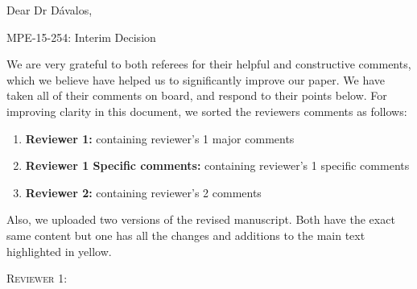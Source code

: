 \documentclass[12pt,letterpaper]{article}
\renewcommand{\section}[1]{%
\bigskip
\begin{center}
\begin{Large}
\normalfont\scshape #1
\medskip
\end{Large}
\end{center}}
\begin{document}
Dear Dr D\'{a}valos,

MPE-15-254: Interim Decision

We are very grateful to both referees for their helpful and constructive comments, which we believe have helped us to significantly improve our paper. We have taken all of their comments on board, and respond to their points below. For improving clarity in this document, we sorted the reviewers comments as follows:
\begin{enumerate}
\item \textbf{Reviewer 1:} containing reviewer's 1 major comments
\item \textbf{Reviewer 1 Specific comments:} containing reviewer's 1 specific comments
\item \textbf{Reviewer 2:} containing reviewer's 2 comments
\end{enumerate}
Also, we uploaded two versions of the revised manuscript. Both have the exact same content but one has all the changes and additions to the main text highlighted in yellow.



\section{Reviewer 1:}
\end{document}
